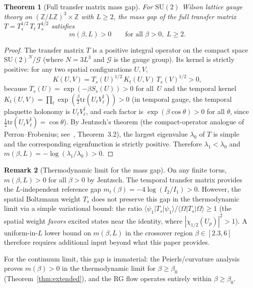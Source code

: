 \documentclass[11pt]{article}
\newtheorem{theorem}{Theorem}[section]
\theoremstyle{definition}
\newtheorem{remark}[theorem]{Remark}
\newcommand{\SU}{\mathrm{SU}}
\newcommand{\tr}{\mathrm{tr}}
\newcommand{\Z}{\mathbb{Z}}
\begin{document}
\begin{theorem}[Full transfer matrix mass gap]\label{thm:Ts}
For $\SU(2)$ Wilson lattice gauge theory on $(\Z/L\Z)^3\times\Z$
with $L\ge 2$, the mass gap of the full transfer matrix
$T=T_s^{1/2}\,T_t\,T_s^{1/2}$ satisfies
\begin{equation}\label{eq:full-gap}
m(\beta,L)>0\qquad\text{for all }\beta>0,\;L\ge 2.
\end{equation}
\end{theorem}

\begin{proof}
The transfer matrix $T$ is a positive integral operator on the compact
space $\SU(2)^N/\mathcal{G}$ (where $N=3L^3$ and $\mathcal{G}$ is the
gauge group).  Its kernel is strictly positive: for any two spatial
configurations $U,V$,
\[
K(U,V)=T_s(U)^{1/2}\,K_t(U,V)\,T_s(V)^{1/2}>0,
\]
because $T_s(U)=\exp(-\beta S_s(U))>0$ for all~$U$ and the temporal
kernel $K_t(U,V)=\prod_\ell\exp(\frac{\beta}{2}\tr(U_\ell V_\ell^\dagger))
>0$ (in temporal gauge, the temporal plaquette holonomy is
$U_\ell V_\ell^\dagger$, and each factor is $\exp(\beta\cos\theta)>0$
for all $\theta$, since $\tfrac{1}{2}\tr(U_\ell V_\ell^\dagger)=\cos\theta$).
By Jentzsch's theorem (the compact-operator analogue of
Perron--Frobenius; see~\cite{Seiler82}, Theorem~3.2), the largest
eigenvalue $\lambda_0$ of $T$ is simple and the corresponding
eigenfunction is strictly positive.  Therefore $\lambda_1<\lambda_0$ and
$m(\beta,L)=-\log(\lambda_1/\lambda_0)>0$.
\end{proof}

\begin{remark}[Thermodynamic limit for the mass gap]\label{rem:thermo}
On any finite torus, $m(\beta,L)>0$ for all $\beta>0$ by Jentzsch.
The temporal transfer matrix provides the $L$-independent reference
gap $m_t(\beta)=-4\log(I_2/I_1)>0$.  However, the spatial Boltzmann
weight $T_s$ does not preserve this gap in the thermodynamic limit
via a simple variational bound: the ratio
$\langle\psi_1|T_s|\psi_1\rangle/\langle\Omega|T_s|\Omega\rangle\ge 1$
(the spatial weight \emph{favors} excited states near the identity,
where $|\chi_{1/2}(U_p)|^2>1$).  A uniform-in-$L$ lower bound on
$m(\beta,L)$ in the crossover region $\beta\in[2.3,6]$ therefore
requires additional input beyond what this paper provides.

For the continuum limit, this gap is immaterial:
the Peierls/curvature analysis proves $m(\beta)>0$ in the thermodynamic
limit for $\beta\ge\beta_0$ (Theorem~\ref{thm:extended}), and the RG flow operates entirely within
$\beta\ge\beta_0$.
\end{remark}
\end{document}
